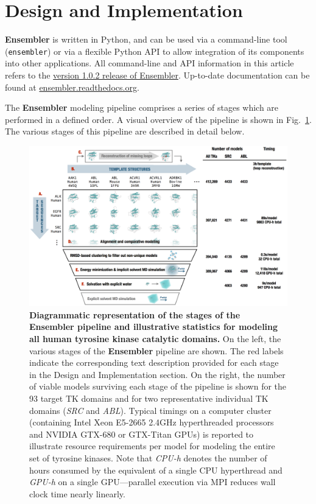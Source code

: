 \documentclass[aps,pre,twocolumn,nofootinbib,superscriptaddress,linenumbers]{revtex4-1}
\begin{document}
\section{Design and Implementation}

{\bf Ensembler} is written in Python, and can be used via a command-line tool ({\tt ensembler}) or via a flexible Python API to allow integration of its components into other applications.
All command-line and API information in this article refers to the \href{https://github.com/choderalab/ensembler/tree/v1.0.2}{version 1.0.2 release of Ensembler}.
Up-to-date documentation can be found at \href{http://ensembler.readthedocs.org/en/latest/}{ensembler.readthedocs.org}.

The {\bf Ensembler} modeling pipeline comprises a series of stages which are performed in a defined order. 
A visual overview of the pipeline is shown in Fig.~\ref{figure:pipeline}.
The various stages of this pipeline are described in detail below.

\begin{figure}[tb]
    \includegraphics[width=1.0\textwidth]{pipeline/pipeline2}

  \caption{{\bf Diagrammatic representation of the stages of the Ensembler pipeline and illustrative statistics for modeling all human tyrosine kinase catalytic domains.}
  On the left, the various stages of the {\bf Ensembler} pipeline are shown.
  The red labels indicate the corresponding text description provided for each stage in the Design and Implementation section.
  On the right, the number of viable models surviving each stage of the pipeline is shown for the 93 target TK domains and for two representative individual TK domains (\emph{SRC} and \emph{ABL}).
  Typical timings on a computer cluster (containing Intel Xeon E5-2665 2.4GHz hyperthreaded processors and NVIDIA GTX-680 or GTX-Titan GPUs) is reported to illustrate resource requirements per model for modeling the entire set of tyrosine kinases.
  Note that \emph{CPU-h} denotes the number of hours consumed by the equivalent of a single CPU hyperthread and \emph{GPU-h} on a single GPU---parallel execution via MPI reduces wall clock time nearly linearly.
  }
  \label{figure:pipeline}
\end{figure}
\end{document}
